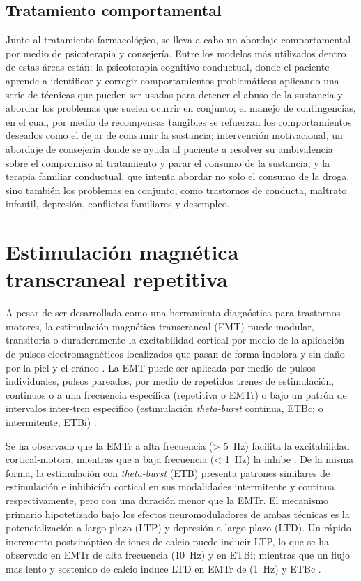 \subsection{Tratamiento comportamental}
Junto al tratamiento farmacológico, se lleva a cabo un abordaje comportamental por medio de psicoterapia y consejería.
Entre los modelos más utilizados \parencite{Volkow2008} dentro de estas áreas están:
la psicoterapia cognitivo-conductual, donde el paciente aprende a identificar y corregir comportamientos problemáticos aplicando una serie de técnicas que pueden ser usadas para detener el abuso de la sustancia y abordar los problemas que suelen ocurrir en conjunto;
el manejo de contingencias, en el cual, por medio de recompensas tangibles se refuerzan los comportamientos deseados como el dejar de consumir la sustancia;
intervención motivacional, un abordaje de consejería donde se ayuda al paciente a resolver su ambivalencia sobre el compromiso al tratamiento y parar el consumo de la sustancia;
y la terapia familiar conductual, que intenta abordar no solo el consumo de la droga, sino también los problemas en conjunto, como trastornos de conducta, maltrato infantil, depresión, conflictos familiares y desempleo.

\section{Estimulación magnética transcraneal repetitiva}
A pesar de ser desarrollada como una herramienta diagnóstica para trastornos motores, la estimulación magnética transcraneal (EMT) puede modular, transitoria o duraderamente la excitabilidad cortical por medio de la aplicación de pulsos electromagnéticos localizados que pasan de forma indolora y sin daño por la piel y el cráneo \parencite{Horvath2011a, Noohi2016}.
La EMT puede ser aplicada por medio de pulsos individuales, pulsos pareados, por medio de repetidos trenes de estimulación, continuos o a una frecuencia específica (repetitiva o EMTr) o bajo un patrón de intervalos inter-tren específico (estimulación \textit{theta-burst} continua, ETBc; o intermitente, ETBi) \parencite{Ekhtiari2019}. \par
Se ha observado que la EMTr a alta frecuencia (\deactivatequoting\SI{> 5}{\hertz}\activatequoting) facilita la excitabilidad cortical-motora, mientras que a baja frecuencia (\deactivatequoting\SI{< 1}{\hertz}\activatequoting) la inhibe \parencite{Pascual-Leone1994}.
De la misma forma, la estimulación con \textit{theta-burst} (ETB) presenta patrones similares de estimulación e inhibición cortical en sus modalidades intermitente y continua respectivamente, pero con una duración menor que la EMTr. El mecanismo primario hipotetizado bajo los efectos neuromoduladores de ambas técnicas es la potencialización a largo plazo (LTP) y depresión a largo plazo (LTD).
Un rápido incremento postsináptico de iones de calcio puede inducir LTP, lo que se ha observado en EMTr de alta frecuencia (\SI{10}{\hertz}) y en ETBi; mientras que un flujo mas lento y sostenido de calcio induce LTD en EMTr de (\SI{1}{\hertz}) y ETBc \parencite{Ekhtiari2019}.

